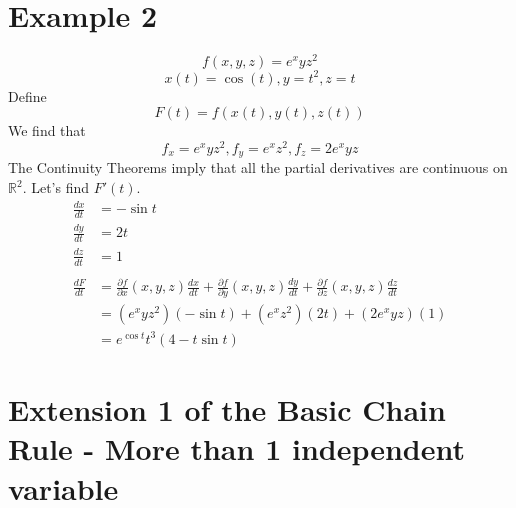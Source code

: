 \documentclass[12pt]{article}
\theoremstyle{definition}
\newcommand{\R}{\mathbb{R}}
\begin{document}
\section{Example 2}
\[f(x,y,z)=e^xyz^2\]
\[x(t)=\cos(t), y=t^2, z=t\]
Define \[F(t)=f(x(t), y(t), z(t))\]
We find that \[f_x=e^xyz^2, f_y=e^xz^2, f_z=2e^xyz\]
The Continuity Theorems imply that all the partial derivatives are continuous on $\R^2$. Let's find $F'(t)$.
\begin{align*}
    \frac{dx}{dt}&=-\sin t\\
    \frac{dy}{dt}&=2t\\
    \frac{dz}{dt}&=1\\\\
    \frac{dF}{dt}&=\frac{\partial f}{\partial x}(x,y,z)\frac{dx}{dt}+\frac{\partial f}{\partial y}(x,y,z)\frac{dy}{dt}+\frac{\partial f}{\partial z}(x,y,z)\frac{dz}{dt}\\
    &=(e^xyz^2)(-\sin t)+(e^xz^2)(2t)+(2e^xyz)(1)\\
    &=e^{\cos t}t^3(4-t\sin t)
\end{align*}

\section{Extension 1 of the Basic Chain Rule - More than 1 independent variable}
\end{document}
